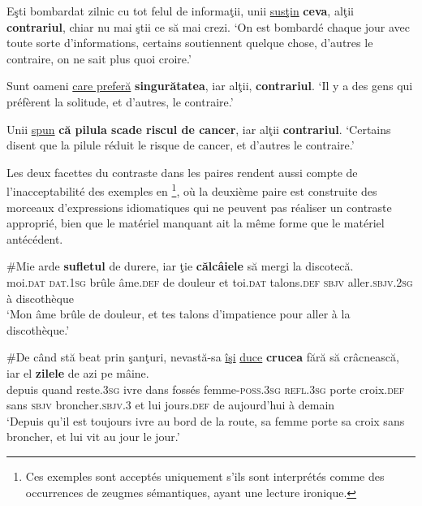 \ea \label{ch2:ex159}
\ea Eşti bombardat zilnic cu tot felul de informaţii, unii \uline{susţin} \textbf{ceva}, alţii \textbf{contrariul}, chiar nu mai ştii ce să mai crezi. \label{ch2:ex159a}
\glt ‘On est bombardé chaque jour avec toute sorte d’informations, certains soutiennent quelque chose, d’autres le contraire, on ne sait plus quoi croire.’  

\ex Sunt oameni \uline{care preferă} \textbf{singurătatea}, iar alţii, \textbf{contrariul}.\label{ch2:ex159b} 
\glt ‘Il y a des gens qui préfèrent la solitude, et d’autres, le contraire.’

\ex Unii \uline{spun} \textbf{că pilula scade riscul de cancer}, iar alţii \textbf{contrariul}. \label{ch2:ex159c}
\glt ‘Certains disent que la pilule réduit le risque de cancer, et d’autres le contraire.’  
\z
\z

 
Les deux facettes du contraste dans les paires rendent aussi compte de l’inacceptabilité des exemples en \footnote{
 Ces exemples sont acceptés uniquement s’ils sont interprétés comme des occurrences de zeugmes sémantiques, ayant une lecture ironique.}, où la deuxième paire est construite des morceaux d’expressions idiomatiques qui ne peuvent pas réaliser un contraste approprié, bien que le matériel manquant ait la même forme que le matériel antécédent.

\ea \label{ch2:ex160}
\ea 
\gll \#Mie    arde  \textbf{sufletul}  de  durere,  iar  ţie  \textbf{călcâiele}  să mergi  la  discotecă.\\  
moi.\textsc{dat} \textsc{dat.1sg} brûle  âme.\textsc{def}  de  douleur  et  toi.\textsc{dat}  talons.\textsc{def} \textsc{sbjv} aller.\textsc{sbjv.2sg}  à  discothèque\\
\glt ‘Mon âme brûle de douleur, et tes talons d’impatience pour aller à la discothèque.’

\ex 
\gll \#De  când  stă  beat  prin  şanţuri,  nevastă-sa \uline{îşi} \uline{duce} \textbf{crucea} fără  să  crâcnească,  iar  el \textbf{zilele} de  azi  pe  mâine.\\ 
depuis  quand  reste.\textsc{3sg}  ivre  dans  fossés  femme-\textsc{poss.3sg} \textsc{refl.3sg}  porte croix.\textsc{def}  sans  \textsc{sbjv}  broncher.\textsc{sbjv.3}  et  lui  jours.\textsc{def}  de  aujourd’hui  à  demain\\
\glt ‘Depuis qu’il est toujours ivre au bord de la route, sa femme porte sa croix sans broncher, et lui vit au jour le jour.’ 

